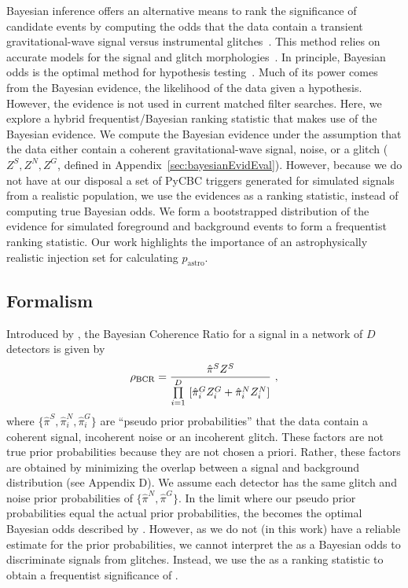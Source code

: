 \documentclass[useAMS,fleqn, usenatbib, final]{mnras}
\begin{document}
Bayesian inference offers an alternative means to rank the significance of candidate events by computing the odds that the data contain a transient gravitational-wave signal versus instrumental glitches~\citep{BCR1}. This method relies on accurate models for the signal and glitch morphologies~\citep{BCR1}. In principle, Bayesian odds is the optimal method for hypothesis testing~\citep{BCR2}. Much of its power comes from the Bayesian evidence, the likelihood of the data given a hypothesis. However, the evidence is not used in current matched filter searches. Here, we explore a hybrid frequentist/Bayesian ranking statistic that makes use of the Bayesian evidence. We compute the Bayesian evidence under the assumption that the data either contain a coherent gravitational-wave signal, noise, or a glitch ($Z^S, Z^N, Z^G$, defined in Appendix~\ref{sec:bayesianEvidEval}). However, because we do not have at our disposal a set of PyCBC triggers generated for simulated signals from a realistic population, we use the evidences as a ranking statistic, instead of computing true Bayesian odds. We form a bootstrapped distribution of the evidence for simulated foreground and background events to form a frequentist ranking statistic.
Our work highlights the importance of an astrophysically realistic injection set for calculating $p_\text{astro}$.

\subsection{Formalism}

Introduced by \citet{BCR1}, the Bayesian Coherence Ratio for a signal in a network of $D$ detectors is given by
\begin{equation}
\label{eq:bcr}
\bcr = \frac{\hat{\pi}^S Z^S}{\prod\limits^D_{i=1} \ [\hat{\pi}^G_i Z^G_i + \hat{\pi}^N_i Z^N_i]}\  ,
\end{equation}
where $\{\hat{\pi}^S, \hat{\pi}^N_i, \hat{\pi}^G_i\}$ are ``pseudo prior probabilities'' that the data contain a coherent signal, incoherent noise or an incoherent glitch. These factors are not true prior probabilities because they are not chosen a priori. 
Rather, these factors are obtained by minimizing the overlap between a signal and background distribution (see Appendix D). 
We assume each detector has the same glitch and noise prior probabilities of $\{\hat{\pi}^N, \hat{\pi}^G\}$. In the limit where our pseudo prior probabilities equal the actual prior probabilities, the \bcr becomes the optimal Bayesian odds described by \citet{BCR2}.  However, as we do not (in this work) have a reliable estimate for the prior probabilities, we cannot interpret the \bcr as a Bayesian odds to discriminate signals from glitches. 
Instead, we use the \bcr as a ranking statistic to obtain a frequentist significance of \bcr.  
\end{document}
